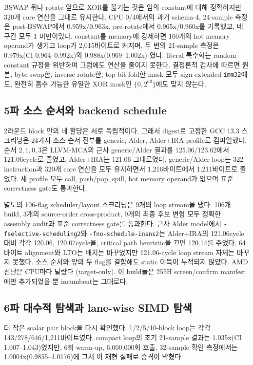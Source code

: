 \documentclass[11pt,a4paper]{article}
\begin{document}
BSWAP 뒤나
rotate 앞으로 XOR를 옮기는 것은 임의 constant에 대해 정확하지만 320개
core 연산을 그대로 유지한다.  CPU 0/4에서의 과거 schema-4, 24-sample
측정은 post-BSWAP에서 0.959x/0.963x, pre-rotate에서 0.965x/0.960x를
기록했고, 네 구간 모두 1 미만이었다.  constant를 memory에 강제하면
160개의 hot memory operand가 생기고 loop가 2,015바이트로 커지며, 두
번의 21-sample 측정은 0.979x(CI 0.964--0.992x)와 0.988x(0.969--1.002x)
였다.  literal 특수화는 random-constant 규정을 위반하며 그럼에도
연산을 줄이지 못한다.  결정론적 검사에 따르면 원본, byte-swap한,
inverse-rotate한, top-bit-fold한 mask 모두 sign-extended
\texttt{imm32}에도, 완전히 흡수 가능한 유일한 XOR mask인
$\{0,2^{63}\}$에도 맞지 않는다.

\subsection{5파 소스 순서와 backend schedule}

2라운드 block 안의 네 할당은 서로 독립적이다.  그래서 digest로 고정한
GCC 13.3 스크리닝은 24가지 소스 순서 전부를 generic, Alder, Alder+IRA
profile로 컴파일했다.  순서 $2,1,0,3$은 LLVM-MCA의 근사
generic/Alder 결과를 125.06/123.62에서 121.06cycle로 줄였고, Alder+IRA는
121.06 그대로였다.  generic/Alder loop는 322 instruction과 320개 core
연산을 모두 유지하면서 1,216바이트에서 1,211바이트로 줄었다.  세
profile 모두 call, push/pop, spill, hot memory operand가 없으며 표준
correctness gate도 통과한다.

별도의 106-flag scheduler/layout 스크리닝은 9개의 loop stream을 냈다.
106개 build, 3개의 source-order cross-product, 9개의 최종 후보 변형
모두 정확한 assembly audit과 표준 correctness gate를 통과한다.  근사
Alder model에서 \texttt{-fselective-scheduling2}와
\texttt{-fno-schedule-insns2}는 Alder+IRA의 121.06cycle 대비 각각
120.06, 120.07cycle을, critical path heuristic을 끄면 120.14를
주었다. 64바이트 alignment와 LTO는 배치는 바꾸었지만 121.06-cycle
loop stream 자체는 바꾸지 못했다.  소스 순서와 앞의 두 flag를
결합해도 static 이득이 누적되지 않았다.  AMD 진단은 CPU마다 달랐다
(target-only).  이 build들은 255H
screen/confirm manifest에만 추가되었을 뿐 incumbent는 그대로다.

\subsection{6파 대수적 탐색과 lane-wise SIMD 탐색}

더 작은 scalar pair block을 다시 확인했다.
1/2/5/10-block loop는 각각 143/278/646/1,211바이트였다.  compact loop의
초기 21-sample 결과는 1.035x(CI 1.007--1.043)였지만, 6회 warm-up,
6,000,000회 호출, 32-sample 확인 측정에서는 1.0004x(0.9855--1.0176)에
그쳐 이 재현 실패로 승격이 막혔다.
\end{document}
